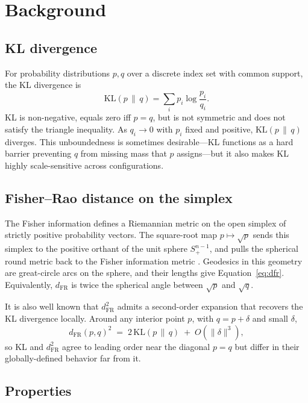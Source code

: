 \documentclass[11pt]{article}
\begin{document}
\section{Background}

\subsection{KL divergence}

For probability distributions $p,q$ over a discrete index set with common support, the KL
divergence is
\begin{equation}
  \mathrm{KL}(p\,\|\,q) = \sum_i p_i\log\frac{p_i}{q_i}.
\end{equation}
KL is non-negative, equals zero iff $p=q$, but is not symmetric and does not satisfy the
triangle inequality. As $q_i\to 0$ with $p_i$ fixed and positive, $\mathrm{KL}(p\,\|\,q)$
diverges. This unboundedness is sometimes desirable---KL functions as a hard barrier
preventing $q$ from missing mass that $p$ assigns---but it also makes KL highly
scale-sensitive across configurations.

\subsection{Fisher--Rao distance on the simplex}

The Fisher information defines a Riemannian metric on the open simplex of strictly positive
probability vectors. The square-root map $p\mapsto \sqrt{p}$ sends this simplex to the positive
orthant of the unit sphere $S^{n-1}_{+}$, and pulls the spherical round metric back to the
Fisher information metric \citep{nielsen2020elementary}. Geodesics in this geometry are great-circle arcs
on the sphere, and their lengths give Equation~\eqref{eq:dfr}. Equivalently, $d_{\mathrm{FR}}$
is twice the spherical angle between $\sqrt{p}$ and $\sqrt{q}$.

It is also well known that $d_{\mathrm{FR}}^2$ admits a second-order expansion that recovers
the KL divergence locally. Around any interior point $p$, with $q = p + \delta$ and small
$\delta$,
\begin{equation}
  d_{\mathrm{FR}}(p,q)^2 \;=\; 2\,\mathrm{KL}(p\,\|\,q) \;+\; O(\|\delta\|^3),
\end{equation}
so KL and $d_{\mathrm{FR}}^2$ agree to leading order near the diagonal $p=q$ but differ in
their globally-defined behavior far from it.

\subsection{Properties}
\end{document}

